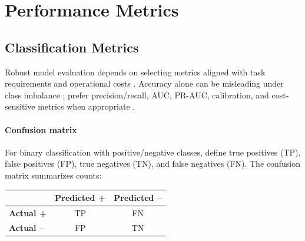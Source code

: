 
\section{Performance Metrics}
\label{sec:performance-metrics}

\subsection{Classification Metrics}

Robust model evaluation depends on selecting metrics aligned with task requirements and operational costs . Accuracy alone can be misleading under class imbalance ; prefer precision/recall, AUC, PR-AUC, calibration, and cost-sensitive metrics when appropriate \textcite{GoodfellowEtAl2016,Prince2023}.

\paragraph{Confusion matrix} For binary classification with positive/negative classes, define true positives (TP), false positives (FP), true negatives (TN), and false negatives (FN). The confusion matrix  summarizes counts:

\begin{center}
\begin{tabular}{@{}lcc@{}}\toprule
 & \textbf{Predicted +} & \textbf{Predicted --} \\
\midrule
\textbf{Actual +} & TP & FN \\
\textbf{Actual --} & FP & TN \\
\bottomrule
\end{tabular}
\end{center}

